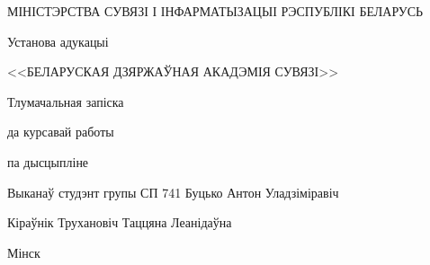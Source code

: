 \begin{TitlePage}
    МІНІСТЭРСТВА СУВЯЗІ І ІНФАРМАТЫЗАЦЫІ РЭСПУБЛІКІ БЕЛАРУСЬ

    Установа адукацыі

    <<БЕЛАРУСКАЯ ДЗЯРЖАЎНАЯ АКАДЭМІЯ СУВЯЗІ>>

    \faculty{\telecommunication}

    \department{\software}

    \vspace{5cm}
    

    \vspace{\baselineskip}

    Тлумачальная запіска

    да курсавай работы

    па дысцыпліне

    
    \vspace{6.5cm}

    Выканаў студэнт групы СП 741 \hfill Буцько Антон Уладзіміравіч

    \vspace{\baselineskip}

    Кіраўнік \hfill Трухановіч Таццяна Леанідаўна

    \vfill

    Мінск \the\year
\end{TitlePage}
